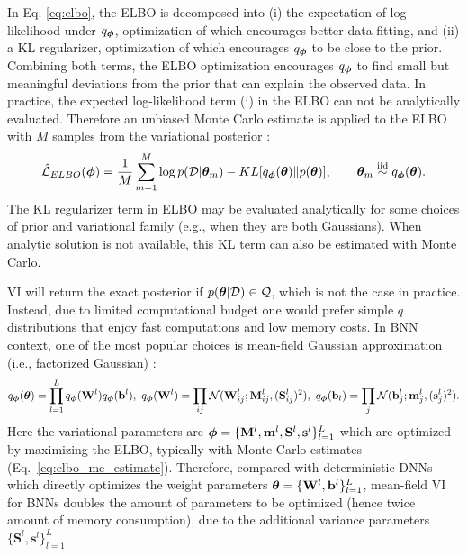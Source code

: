 %
In Eq. \eqref{eq:elbo}, the ELBO is decomposed into (i) the expectation of log-likelihood under $q_{\bm{\phi}}$, optimization of which encourages better data fitting, and (ii) a KL regularizer, optimization of which encourages $q_{\bm{\phi}}$ to be close to the prior. Combining both terms, the ELBO optimization encourages $q_{\bm{\phi}}$ to find small but meaningful deviations from the prior that can explain the observed data.
%
In practice, the expected log-likelihood term (i) in the ELBO can not be analytically evaluated. Therefore an unbiased Monte Carlo estimate is applied to the ELBO with $M$ samples from the variational posterior \citep{graves2011practical,blundell2015bbp}:
%
\begin{equation}
    \hat{\mathcal{L}}_{ELBO}(\bm{\phi}) = \frac{1}{M} \sum_{m=1}^M \log p(\mathcal{D}|\bm{\theta}_m) - KL[q_{\bm{\phi}}(\bm{\theta})\|p(\bm{\theta})], \qquad \bm{\theta}_m \stackrel{\text{iid}}{\sim} q_{\bm{\phi}}(\bm{\theta}) .
\label{eq:elbo_mc_estimate}
\end{equation}
%
The KL regularizer term in ELBO may be evaluated analytically for some choices of prior and variational family (e.g., when they are both Gaussians). When analytic solution is not available, this KL term can also be estimated with Monte Carlo.

VI will return the exact posterior if $p(\bm{\theta} |\mathcal{D}) \in \mathcal{Q}$, which is not the case in practice. Instead, due to limited computational budget one would prefer simple $q$ distributions that enjoy fast computations and low memory costs. In BNN context, one of the most popular choices is mean-field Gaussian approximation (i.e., factorized Gaussian) \citep{blundell2015bbp}:
\begin{equation}
    q_{\vparam}(\mparam) = \prod_{l=1}^L q_{\vparam}(\weight^l)q_{\vparam}(\mathbf{b}^l), \ q_{\vparam}(\weight^l) = \prod_{ij} \mathcal{N}(\weight^l_{ij}; \mathbf{M}^l_{ij}, (\mathbf{S}^l_{ij})^2), \ q_{\vparam}(\mathbf{b}_l) = \prod_j \mathcal{N}(\mathbf{b}^l_{j}; \mathbf{m}^l_{j}, (\s^l_{j})^2).
\label{eq:mean_field_bnn_q_distribution}
\end{equation}
Here the variational parameters are $\bm{\phi} = \{\mathbf{M}^l, \mathbf{m}^l, \mathbf{S}^l, \mathbf{s}^l \}_{l=1}^L$ which are optimized by maximizing the ELBO, typically with Monte Carlo estimates (Eq.~\eqref{eq:elbo_mc_estimate}). Therefore, compared with deterministic DNNs which directly optimizes the weight parameters $\bm{\theta}=\{\mathbf{W}^l, \mathbf{b}^l\}_{l=1}^L$, mean-field VI for BNNs doubles the amount of parameters to be optimized (hence twice amount of memory consumption), due to the additional variance parameters $\{\mathbf{S}^l, \mathbf{s}^l \}_{l=1}^L$. 

